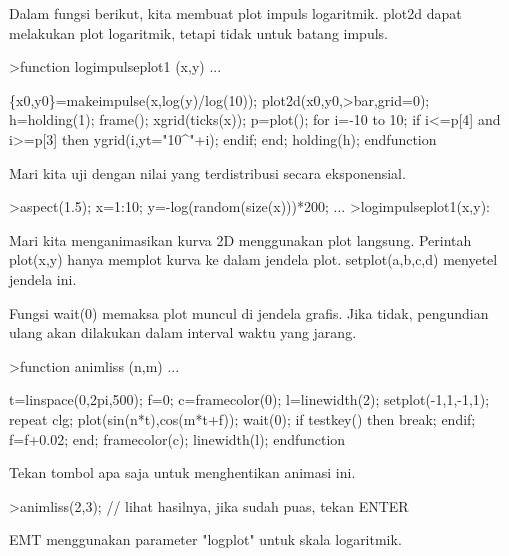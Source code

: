 \documentclass{article}
\begin{document}
\begin{eulernotebook}
\begin{eulercomment}
\begin{eulercomment}
\begin{eulercomment}
\begin{eulercomment}
\begin{eulercomment}
Dalam fungsi berikut, kita membuat plot impuls logaritmik. plot2d
dapat melakukan plot logaritmik, tetapi tidak untuk batang impuls.
\end{eulercomment}
\begin{eulerprompt}
>function logimpulseplot1 (x,y) ...
\end{eulerprompt}
\begin{eulerudf}
    \{x0,y0\}=makeimpulse(x,log(y)/log(10));
    plot2d(x0,y0,>bar,grid=0);
    h=holding(1);
    frame();
    xgrid(ticks(x));
    p=plot();
    for i=-10 to 10;
      if i<=p[4] and i>=p[3] then
         ygrid(i,yt="10^"+i);
      endif;
    end;
    holding(h);
  endfunction
\end{eulerudf}
\begin{eulercomment}
Mari kita uji dengan nilai yang terdistribusi secara eksponensial.
\end{eulercomment}
\begin{eulerprompt}
>aspect(1.5); x=1:10; y=-log(random(size(x)))*200; ...
>logimpulseplot1(x,y):
\end{eulerprompt}
\begin{eulercomment}
Mari kita menganimasikan kurva 2D menggunakan plot langsung. Perintah
plot(x,y) hanya memplot kurva ke dalam jendela plot. setplot(a,b,c,d)
menyetel jendela ini.

Fungsi wait(0) memaksa plot muncul di jendela grafis. Jika tidak,
pengundian ulang akan dilakukan dalam interval waktu yang jarang.
\end{eulercomment}
\begin{eulerprompt}
>function animliss (n,m) ...
\end{eulerprompt}
\begin{eulerudf}
  t=linspace(0,2pi,500);
  f=0;
  c=framecolor(0);
  l=linewidth(2);
  setplot(-1,1,-1,1);
  repeat
    clg;
    plot(sin(n*t),cos(m*t+f));
    wait(0);
    if testkey() then break; endif;
    f=f+0.02;
  end;
  framecolor(c);
  linewidth(l);
  endfunction
\end{eulerudf}
\begin{eulercomment}
Tekan tombol apa saja untuk menghentikan animasi ini.
\end{eulercomment}
\begin{eulerprompt}
>animliss(2,3); // lihat hasilnya, jika sudah puas, tekan ENTER
\end{eulerprompt}
\begin{eulercomment}
EMT menggunakan parameter "logplot" untuk skala logaritmik.


\end{eulercomment}
\end{eulercomment}
\end{eulercomment}
\end{eulercomment}
\end{eulercomment}
\end{eulernotebook}
\end{document}

